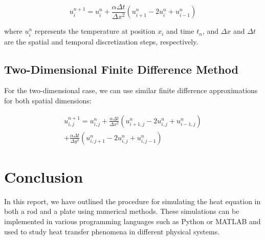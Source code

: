 \documentclass{article}
\begin{document}
\begin{equation}
    u_{i}^{n+1} = u_{i}^{n} + \frac{\alpha \Delta t}{\Delta x^2} \left( u_{i+1}^{n} - 2u_{i}^{n} + u_{i-1}^{n} \right)
\end{equation}

where $u_{i}^{n}$ represents the temperature at position $x_i$ and time $t_n$, and $\Delta x$ and $\Delta t$ are the spatial and temporal discretization steps, respectively.

\subsection{Two-Dimensional Finite Difference Method}
For the two-dimensional case, we can use similar finite difference approximations for both spatial dimensions:

\begin{multline}
    u_{i,j}^{n+1} = u_{i,j}^{n} + \frac{\alpha \Delta t}{\Delta x^2} \left( u_{i+1,j}^{n} - 2u_{i,j}^{n} + u_{i-1,j}^{n} \right) \\
    + \frac{\alpha \Delta t}{\Delta y^2} \left( u_{i,j+1}^{n} - 2u_{i,j}^{n} + u_{i,j-1}^{n} \right)
\end{multline}

\section{Conclusion}
In this report, we have outlined the procedure for simulating the heat equation in both a rod and a plate using numerical methods. These simulations can be implemented in various programming languages such as Python or MATLAB and used to study heat transfer phenomena in different physical systems.
\end{document}
